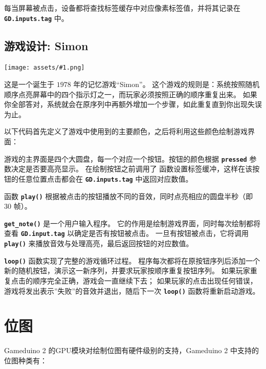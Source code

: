 \documentclass[10pt]{book}
\makeatletter
\newcommand{\gdtwo}{Gameduino 2 }
\newcommand{\png}[1]{
\begin{center}
\texttt{[image: assets/\#1.png]}
\end{center}
}
\newcommand{\mach}[1]{\texttt{\textbf{#1}}}
\newcommand{\cmdidx}[1]{
\index{#1@\mach{#1()}}
}
\newcommand{\dcmd}[1]{\cmdidx{#1}\nameref{#1}}
\makeatother
\begin{document}
\begin{CJK}{UTF8}{gkai}
\vspace{10pt}

\noindent
每当屏幕被点击，设备都将查找标签缓存中对应像素标签值，并将其记录在 \mach{GD.inputs.tag} 中。

\cleartoleftpage
\section{游戏设计: Simon}
\label{simon}

\png{simon}

这是一个诞生于 $1978$ 年的记忆游戏``Simon''。 这个游戏的规则是：系统按照随机顺序点亮屏幕中的四个指示灯之一，而玩家必须按照正确的顺序重复出来。
如果你全部答对，系统就会在原序列中再额外增加一个步骤，如此重复直到你出现失误为止。

以下代码首先定义了游戏中使用到的主要颜色，之后将利用这些颜色绘制游戏界面：


\noindent

游戏的主界面是四个大圆盘，每一个对应一个按钮。按钮的颜色根据 \mach{pressed} 参数决定是否要高亮显示。
在绘制按钮之前调用了 \dcmd{Tag} 函数设置标签缓冲，这样在该按钮的任意位置点击都会在 \mach{GD.inputs.tag} 中返回对应数值。

\newpage
{}

函数 \mach{play()} 根据被点击的按钮播放不同的音效，同时点亮相应的圆盘半秒（即 $30$ 帧）。


\mach{get\_note()} 是一个用户输入程序。
它的作用是绘制游戏界面，同时每次绘制都将查看 \mach{GD.input.tag} 以确定是否有按钮被点击。
一旦有按钮被点击，它将调用 \mach{play()} 来播放音效与处理高亮，最后返回按钮的对应数值。


\mach{loop()} 函数实现了完整的游戏循环过程。
程序每次都将在原按钮序列后添加一个新的随机按钮，演示这一新序列，并要求玩家按顺序重复按钮序列。
如果玩家重复点击的顺序完全正确，游戏会一直继续下去；
如果玩家的点击出现任何错误，游戏将发出表示''失败''的音效并退出，随后下一次 \mach{loop()} 函数将重新启动游戏。


\chapter{位图}

\gdtwo 的GPU模块对绘制位图有硬件级别的支持，\gdtwo 中支持的位图种类有：


\end{CJK}
\end{document}

